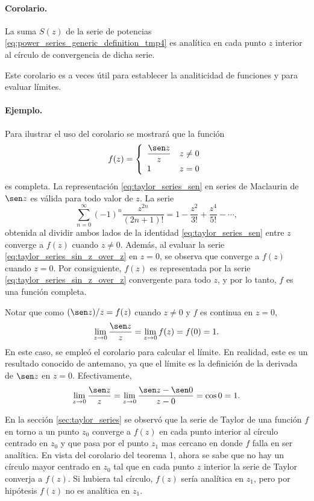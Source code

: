 \documentclass[a4paper]{report}
\begin{document}
\paragraph{Corolario.} La suma \(S(z)\) de la serie de potencias \ref{eq:power_series_generic_definition_tmp4} es analítica en cada punto \(z\) interior al círculo de convergencia de dicha serie.

Este corolario es a veces útil para establecer la analiticidad de funciones y para evaluar límites.

\paragraph{Ejemplo.} Para ilustrar el uso del corolario se mostrará que la función
\[
 f(z)=
 \left\{ 
 \begin{array}{ll}
  \displaystyle\frac{\sen z}{z} & z\neq0\\[\medskipamount]
  1 & z=0
 \end{array}
 \right.
\]
es completa. La representación \ref{eq:taylor_series_sen} en series de Maclaurin de \(\sen z\) es válida para todo valor de \(z\). La serie
\begin{equation}\label{eq:taylor_series_sin_z_over_z}
 \sum_{n=0}^\infty(-1)^n\frac{z^{2n}}{(2n+1)!}=1-\frac{z^2}{3!}+\frac{z^4}{5!}-\cdots, 
\end{equation}
obtenida al dividir ambos lados de la identidad \ref{eq:taylor_series_sen} entre \(z\) converge a \(f(z)\) cuando \(z\neq0\). Además, al evaluar la serie \ref{eq:taylor_series_sin_z_over_z} en \(z=0\), se observa que converge a \(f(z)\) cuando \(z=0\). Por consiguiente, \(f(z)\) es representada por la serie \ref{eq:taylor_series_sin_z_over_z} convergente para todo \(z\), y por lo tanto, \(f\) es una función completa.

Notar que como \((\sen z)/z=f(z)\) cuando \(z\neq0\) y \(f\) es continua en \(z=0\),
\[
 \lim_{z\to0}\frac{\sen z}{z}=\lim_{z\to0}f(z)=f(0)=1.
\]
En este caso, se empleó el corolario para calcular el límite. En realidad, este es un resultado conocido de antemano, ya que el límite es la definición de la derivada de \(\sen z\) en \(z=0\). Efectivamente,
\[
 \lim_{z\to0}\frac{\sen z}{z}=\lim_{z\to0}\frac{\sen z-\sen0}{z-0}=\cos 0=1.
\]

En la sección \ref{sec:taylor_series} se observó que la serie de Taylor de una función \(f\) en torno a un punto \(z_0\) converge a \(f(z)\) en cada punto interior al círculo centrado en \(z_0\) y que pasa por el punto \(z_1\) mas cercano en donde \(f\) falla en ser analítica. En vista del corolario del teorema 1, ahora se sabe que no hay un círculo mayor centrado en \(z_0\) tal que en cada punto \(z\) interior la serie de Taylor converja a \(f(z)\). Si hubiera tal círculo, \(f(z)\) sería analítica en \(z_1\), pero por hipótesis \(f(z)\) no es analítica en \(z_1\).
\end{document}
